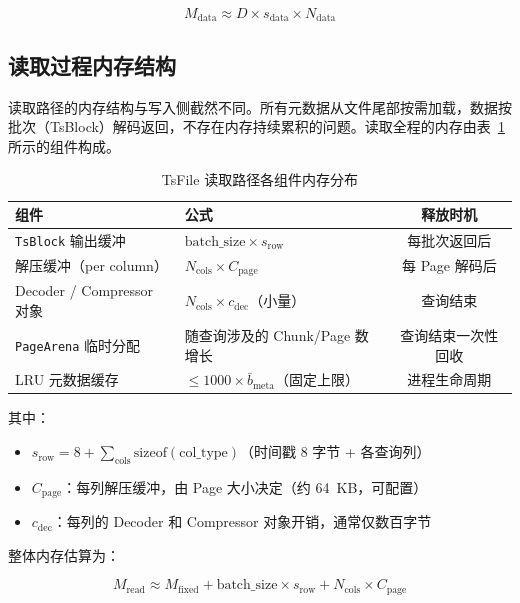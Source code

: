 \begin{equation}
  M_{\text{data}} \approx D \times s_{\text{data}} \times N_{\text{data}}
  \label{eq:m-data-steady}
\end{equation}

\subsection{读取过程内存结构}
\label{subsec:read-mem-structure}

读取路径的内存结构与写入侧截然不同。所有元数据从文件尾部按需加载，数据按批次（TsBlock）解码返回，不存在内存持续累积的问题。读取全程的内存由表~\ref{tab:read-mem-components} 所示的组件构成。

\begin{table}[htbp]
  \centering
  \caption{TsFile 读取路径各组件内存分布}
  \label{tab:read-mem-components}
  \begin{tabularx}{\textwidth}{l X c}
    \toprule
    组件 & 公式 & 释放时机 \\
    \midrule
    \texttt{TsBlock} 输出缓冲 & $\text{batch\_size} \times s_{\text{row}}$ & 每批次返回后 \\
    解压缓冲（per column） & $N_{\text{cols}} \times C_{\text{page}}$ & 每 Page 解码后 \\
    Decoder / Compressor 对象 & $N_{\text{cols}} \times c_{\text{dec}}$（小量） & 查询结束 \\
    \texttt{PageArena} 临时分配 & 随查询涉及的 Chunk/Page 数增长 & 查询结束一次性回收 \\
    LRU 元数据缓存 & $\leq 1000 \times \bar{b}_{\text{meta}}$（固定上限） & 进程生命周期 \\
    \bottomrule
  \end{tabularx}
\end{table}

其中：

\begin{itemize}
  \item $s_{\text{row}} = 8 + \sum_{\text{cols}} \text{sizeof}(\text{col\_type})$（时间戳 8 字节 + 各查询列）
  \item $C_{\text{page}}$：每列解压缓冲，由 Page 大小决定（约 64~KB，可配置）
  \item $c_{\text{dec}}$：每列的 Decoder 和 Compressor 对象开销，通常仅数百字节
\end{itemize}

整体内存估算为：

\begin{equation}
  M_{\text{read}} \approx M_{\text{fixed}} + \text{batch\_size} \times s_{\text{row}} + N_{\text{cols}} \times C_{\text{page}}
  \label{eq:m-read}
\end{equation}

